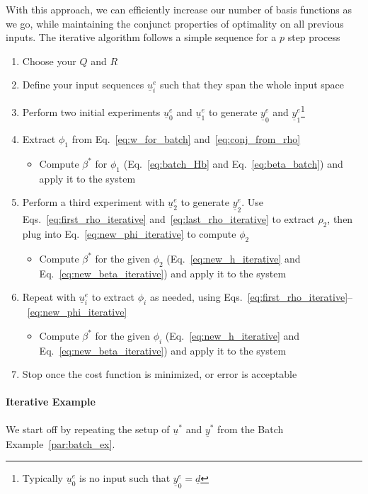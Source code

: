 With this approach, we can efficiently increase our number of basis functions as we go, while maintaining the conjunct properties of optimality on all previous inputs. The iterative algorithm follows a simple sequence for a $p$ step process
\begin{enumerate}
    \item Choose your $Q$ and $R$
    \item Define your input sequences $\underline{u}^e_i$ such that they span the whole input space
    \item Perform two initial experiments $\underline{u}^e_0$ and $\underline{u}^e_1$ to generate $\underline{y}^e_0$ and $\underline{y}^e_1$\footnote{Typically $\underline{u}^e_0$ is no input such that $\underline{y}^e_0 = \underline{d}$}
    \item Extract $\phi_1$ from Eq.~\ref{eq:w_for_batch} and~\ref{eq:conj_from_rho}
    \begin{itemize}
        \item Compute $\beta^\ast$ for $\phi_1$ (Eq.~\ref{eq:batch_Hb} and Eq.~\ref{eq:beta_batch}) and apply it to the system
    \end{itemize}
    \item Perform a third experiment with $\underline{u}^e_2$ to generate $\underline{y}^e_2$. Use Eqs.~\ref{eq:first_rho_iterative} and~\ref{eq:last_rho_iterative} to extract $\rho_2$, then plug into Eq.~\ref{eq:new_phi_iterative} to compute $\phi_2$
    \begin{itemize}
        \item Compute $\beta^\ast$ for the given $\phi_2$ (Eq.~\ref{eq:new_h_iterative} and Eq.~\ref{eq:new_beta_iterative}) and apply it to the system
    \end{itemize}
    \item Repeat with $\underline{u}^e_i$ to extract $\phi_i$ as needed, using Eqs.~\ref{eq:first_rho_iterative}--~\ref{eq:new_phi_iterative}
    \begin{itemize}
        \item Compute $\beta^\ast$ for the given $\phi_i$ (Eq.~\ref{eq:new_h_iterative} and Eq.~\ref{eq:new_beta_iterative}) and apply it to the system
    \end{itemize}
    \item Stop once the cost function is minimized, or error is acceptable
\end{enumerate}

\FloatBarrier\paragraph{Iterative Example}
We start off by repeating the setup of $\underline{u}^\ast$ and $\underline{y}^\ast$ from the Batch Example~\ref{par:batch_ex}.

